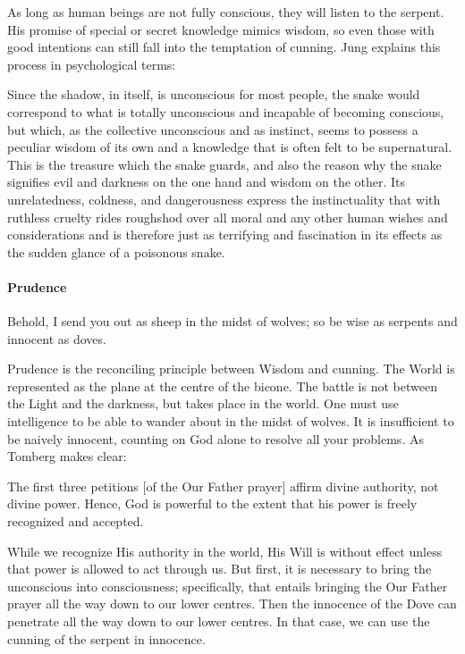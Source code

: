 As long as human beings are not fully conscious, they will listen to the serpent. His promise of special or secret
knowledge mimics wisdom, so even those with good intentions can still fall into the temptation of cunning. Jung
explains this process in psychological terms:

\begin{quotex}
Since the shadow, in itself, is unconscious for most people, the snake would correspond to what is totally unconscious
and incapable of becoming conscious, but which, as the collective unconscious and as instinct, seems to possess a
peculiar wisdom of its own and a knowledge that is often felt to be supernatural. This is the treasure which the snake
guards, and also the reason why the snake signifies evil and darkness on the one hand and wisdom on the other. Its
unrelatedness, coldness, and dangerousness express the instinctuality that with ruthless cruelty rides roughshod over
all moral and any other human wishes and considerations and is therefore just as terrifying and fascination in its
effects as the sudden glance of a poisonous snake. 

\end{quotex}
\paragraph{Prudence}
\begin{quotex}
Behold, I send you out as sheep in the midst of wolves; so be wise as serpents and innocent as doves. 

\end{quotex}
Prudence is the reconciling principle between Wisdom and cunning. The World is represented as the plane at the centre of
the bicone. The battle is not between the Light and the darkness, but takes place in the world. One must use
intelligence to be able to wander about in the midst of wolves. It is insufficient to be naively innocent, counting on
God alone to resolve all your problems. As Tomberg makes clear:

\begin{quotex}
The first three petitions [of the Our Father prayer] affirm divine authority, not divine power. Hence, God is powerful
to the extent that his power is freely recognized and accepted. 

\end{quotex}
While we recognize His authority in the world, His Will is without effect unless that power is allowed to act through
us. But first, it is necessary to bring the unconscious into consciousness; specifically, that entails bringing the Our
Father prayer all the way down to our lower centres. Then the innocence of the Dove can penetrate all the way down to
our lower centres. In that case, we can use the cunning of the serpent in innocence.

